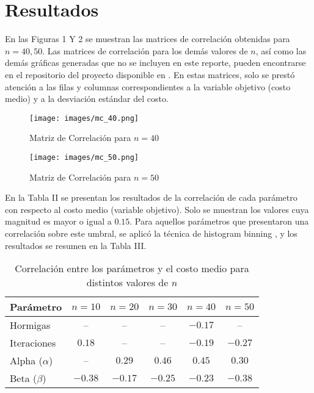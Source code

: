 \documentclass[conference]{IEEEtran}
\begin{document}
\section{Resultados}
En las Figuras 1 Y 2 se muestran las matrices de correlación obtenidas para $n=40,50$. Las matrices de correlación para los demás valores de $n$, así como las demás gráficas generadas que no se incluyen en este reporte, pueden encontrarse en el repositorio del proyecto disponible en \cite{aco_github_2} . En estas matrices, solo se prestó atención a las filas y columnas correspondientes a la variable objetivo (costo medio) y a la desviación estándar del costo.

    \begin{figure}[htbp]
      \centering
      \begin{minipage}[t]{0.45\linewidth}
        \centering
        \texttt{[image: images/mc\_40.png]}
        \caption{Matriz de Correlación para $n=40$}
        \label{fig:image29}
      \end{minipage}
      \hfill
      \begin{minipage}[t]{0.45\linewidth}
        \centering
        \texttt{[image: images/mc\_50.png]}
        \caption{Matriz de Correlación para $n=50$}
        \label{fig:image30}
      \end{minipage}
    \end{figure}

En la Tabla II se presentan los resultados de la correlación de cada parámetro con respecto al costo medio (variable objetivo). Solo se muestran los valores cuya magnitud es mayor o igual a $0.15$. Para aquellos parámetros que presentaron una correlación sobre este umbral, se aplicó la técnica de histogram binning \cite{data_binning_wiki}, y los resultados se resumen en la Tabla III.

\begin{table}[h]
\centering
\begin{tabular}{|l|c|c|c|c|c|}
\hline
Parámetro & $n=10$ & $n=20$ & $n=30$ & $n=40$ & $n=50$ \\
\hline
Hormigas & -- & -- & -- & $-0.17$ & -- \\
\hline
Iteraciones & $0.18$ & -- & -- & $-0.19$ & $-0.27$ \\
\hline
Alpha ($\alpha$) & -- & $0.29$ & $0.46$ & $0.45$ & $0.30$ \\
\hline
Beta ($\beta$) & $-0.38$ & $-0.17$ & $-0.25$ & $-0.23$ & $-0.38$ \\
\hline
\end{tabular}
\caption{Correlación entre los parámetros y el costo medio para distintos valores de $n$}
\label{tab:table2}
\end{table}
\end{document}
